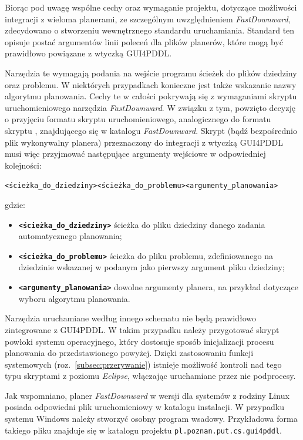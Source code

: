 Biorąc pod uwagę wspólne cechy oraz wymaganie projektu, dotyczące możliwości integracji z wieloma planerami, ze szczególnym uwzględnieniem \emph{FastDownward}, zdecydowano o stworzeniu wewnętrznego standardu uruchamiania. Standard ten opisuje postać argumentów linii poleceń dla plików planerów, które mogą być prawidłowo powiązane z wtyczką GUI4PDDL. 

Narzędzia te wymagają podania na wejście programu ścieżek do plików dziedziny oraz problemu. W niektórych przypadkach konieczne jest także wskazanie nazwy algorytmu planowania. Cechy te w całości pokrywają się z wymaganiami skryptu uruchomieniowego narzędzia \emph{FastDownward}. W związku z tym, powzięto decyzję o przyjęciu formatu skryptu uruchomieniowego, analogicznego do formatu skryptu , znajdującego się w katalogu  \emph{FastDownward}. Skrypt (bądź bezpośrednio plik wykonywalny planera) przeznaczony do integracji z wtyczką GUI4PDDL musi więc przyjmować następujące argumenty wejściowe w odpowiedniej kolejności:

\noindent
\centerline{\texttt{<ścieżka\_do\_dziedziny>}\textvisiblespace\texttt{<ścieżka\_do\_problemu>}\textvisiblespace\texttt{<argumenty\_planowania>}}


\noindent
gdzie:
\begin{itemize}
\item \textbf{\texttt{<ścieżka\_do\_dziedziny>}}  ścieżka do pliku dziedziny danego zadania automatycznego planowania;
\item \textbf{\texttt{<ścieżka\_do\_problemu>}} ścieżka do pliku problemu, zdefiniowanego na dziedzinie wskazanej w podanym jako pierwszy argument pliku dziedziny;
\item \textbf{\texttt{<argumenty\_planowania>}} dowolne argumenty planera, na przykład dotyczące wyboru algorytmu planowania.
\end{itemize}
Narzędzia uruchamiane według innego schematu nie będą prawidłowo zintegrowane z GUI4PDDL. W takim przypadku należy przygotować skrypt powłoki systemu operacyjnego, który dostosuje sposób inicjalizacji procesu planowania do przedstawionego powyżej. Dzięki zastosowaniu funkcji systemowych (roz.~\ref{subsec:przerywanie}) istnieje możliwość kontroli nad tego typu skryptami z poziomu \emph{Eclipse}, włączając uruchamiane przez nie podprocesy.

Jak wspomniano, planer \emph{FastDownward} w wersji dla systemów z rodziny Linux posiada odpowiedni plik uruchomieniowy w katalogu  instalacji. W przypadku systemu Windows należy stworzyć osobny program wsadowy. Przykładowa forma takiego pliku znajduje się w katalogu  projektu \texttt{pl.poznan.put.cs.gui4pddl}.

